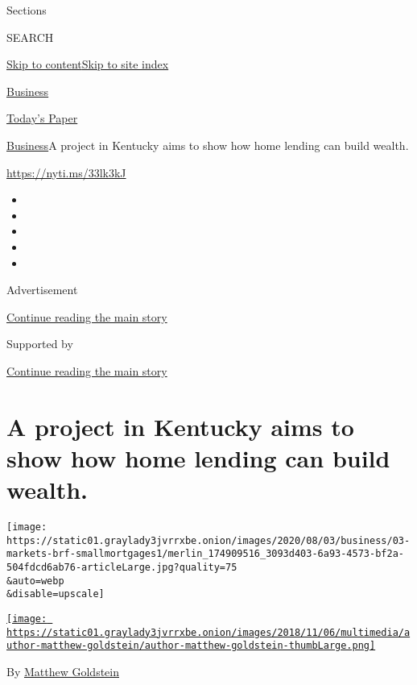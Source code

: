 Sections

SEARCH

\protect\hyperlink{site-content}{Skip to
content}\protect\hyperlink{site-index}{Skip to site index}

\href{https://www.nytimes3xbfgragh.onion/section/business}{Business}

\href{https://myaccount.nytimes3xbfgragh.onion/auth/login?response_type=cookie\&client_id=vi}{}

\href{https://www.nytimes3xbfgragh.onion/section/todayspaper}{Today's
Paper}

\href{/section/business}{Business}\textbar{}A project in Kentucky aims
to show how home lending can build wealth.

\url{https://nyti.ms/33lk3kJ}

\begin{itemize}
\item
\item
\item
\item
\item
\end{itemize}

Advertisement

\protect\hyperlink{after-top}{Continue reading the main story}

Supported by

\protect\hyperlink{after-sponsor}{Continue reading the main story}

\hypertarget{a-project-in-kentucky-aims-to-show-how-home-lending-can-build-wealth}{%
\section{A project in Kentucky aims to show how home lending can build
wealth.}\label{a-project-in-kentucky-aims-to-show-how-home-lending-can-build-wealth}}

\texttt{[image: https://static01.graylady3jvrrxbe.onion/images/2020/08/03/business/03-markets-brf-smallmortgages1/merlin\_174909516\_3093d403-6a93-4573-bf2a-504fdcd6ab76-articleLarge.jpg?quality=75\\\&auto=webp\\\&disable=upscale]}

\href{https://www.nytimes3xbfgragh.onion/by/matthew-goldstein}{\texttt{[image: https://static01.graylady3jvrrxbe.onion/images/2018/11/06/multimedia/author-matthew-goldstein/author-matthew-goldstein-thumbLarge.png]}}

By
\href{https://www.nytimes3xbfgragh.onion/by/matthew-goldstein}{Matthew
Goldstein}

